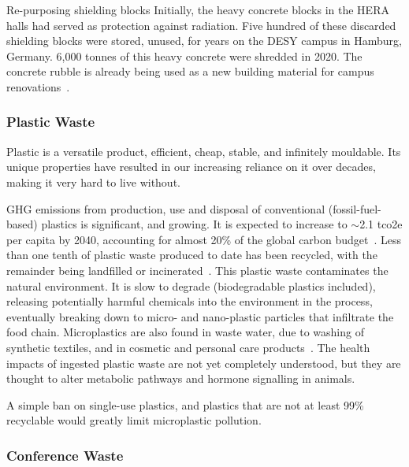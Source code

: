 \documentclass[../SustainableHEP.tex]{subfiles}
\begin{document}

\begin{bestpractice}{Re-purposing shielding blocks}%
\noindent Initially, the heavy concrete blocks in the HERA halls had served
as protection against radiation. Five hundred of these discarded shielding blocks were stored, unused,  for years on the DESY campus in Hamburg, Germany. 6,000 tonnes of this heavy concrete were shredded in 2020. The concrete rubble is already being used as a new building material for campus renovations~\cite{DESYsustainableReport2022}.
\end{bestpractice}

\subsubsection{Plastic Waste}
Plastic is a versatile product, efficient, cheap, stable, and infinitely mouldable.  Its unique properties have resulted in our increasing reliance on it over decades, making it very hard to live without. 

GHG emissions from production, use and disposal of conventional (fossil-fuel-based) plastics is significant, and growing.  It is expected to increase to $\sim$2.1 \acrshort{tco2e} per capita by 2040, accounting for almost 20\% of the global carbon budget~\cite{UNPollutionSolution}.  Less than one tenth of plastic waste produced to date has been recycled, with the remainder being landfilled or incinerated~\cite{UNPollutionSolution}.  This plastic waste contaminates the natural environment.  It is slow to degrade (biodegradable plastics included), releasing potentially harmful chemicals into the environment in the process, eventually breaking down to micro- and nano-plastic particles that infiltrate the food chain.  Microplastics are also found in waste water, due to washing of synthetic textiles, and in cosmetic and personal care products~\cite{Microplastics}.  The health impacts of ingested plastic waste are not yet completely understood, but they are thought to alter metabolic pathways and hormone signalling in animals.

A simple ban on single-use plastics, and plastics that are not at least 99\% recyclable would greatly limit microplastic pollution. 

\subsubsection{Conference Waste\label{sec:ConferenceWaste}}
\end{document}
